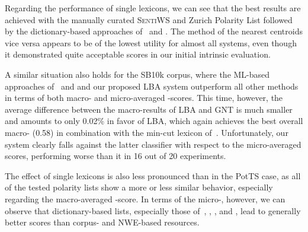 Regarding the performance of single lexicons, we can see that the best
results are achieved with the manually curated \textsc{SentiWS}
\cite{Remus:10} and Zurich Polarity List \cite{Clematide:10} followed
by the dictionary-based approaches of~\citet{Blair-Goldensohn:08} and
\citet{Rao:09}.  The method of the nearest centroids vice versa
appears to be of the lowest utility for almost all systems, even
though it demonstrated quite acceptable scores in our initial
intrinsic evaluation.

A similar situation also holds for the SB10k corpus, where the
ML-based approaches of~\citet{Mohammad:13} and \citet{Guenther:14} and
our proposed LBA system outperform all other methods in terms of both
macro- and micro-averaged \F{}-scores.  This time, however, the
average difference between the macro-results of LBA and GNT is much
smaller and amounts to only 0.02\% in favor of LBA, which again
achieves the best overall macro-\F{} (0.58) in combination with the
min-cut lexicon of~\citet{Rao:09}.  Unfortunately, our system clearly
falls against the latter classifier with respect to the micro-averaged
scores, performing worse than it in 16 out of 20 experiments.

The effect of single lexicons is also less pronounced than in the
PotTS case, as all of the tested polarity lists show a more or less
similar behavior, especially regarding the macro-averaged \F{}-score.
In terms of the micro-\F{}, however, we can observe that
dictionary-based lists, especially those of~\citet{Awadallah:10},
\citet{Blair-Goldensohn:08}, \citet{Hu:04}, and \citet{Kim:04}, lead
to generally better scores than corpus- and NWE-based resources.

